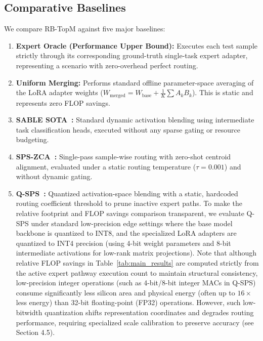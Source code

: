 \subsection{Comparative Baselines}
We compare RB-TopM against five major baselines:
\begin{enumerate}
    \item \textbf{Expert Oracle (Performance Upper Bound):} Executes each test sample strictly through its corresponding ground-truth single-task expert adapter, representing a scenario with zero-overhead perfect routing.
    \item \textbf{Uniform Merging:} Performs standard offline parameter-space averaging of the LoRA adapter weights ($W_{\text{merged}} = W_{\text{base}} + \frac{1}{K}\sum A_k B_k$). This is static and represents zero FLOP savings.
    \item \textbf{SABLE SOTA~\citep{sable2025}:} Standard dynamic activation blending using intermediate task classification heads, executed without any sparse gating or resource budgeting.
    \item \textbf{SPS-ZCA~\citep{spszca2025}:} Single-pass sample-wise routing with zero-shot centroid alignment, evaluated under a static routing temperature ($\tau = 0.001$) and without dynamic gating.
    \item \textbf{Q-SPS~\citep{qsps2026}:} Quantized activation-space blending with a static, hardcoded routing coefficient threshold to prune inactive expert paths. To make the relative footprint and FLOP savings comparison transparent, we evaluate Q-SPS under standard low-precision edge settings where the base model backbone is quantized to INT8, and the specialized LoRA adapters are quantized to INT4 precision (using 4-bit weight parameters and 8-bit intermediate activations for low-rank matrix projections). Note that although relative FLOP savings in Table~\ref{tab:main_results} are computed strictly from the active expert pathway execution count to maintain structural consistency, low-precision integer operations (such as 4-bit/8-bit integer MACs in Q-SPS) consume significantly less silicon area and physical energy (often up to $16\times$ less energy) than 32-bit floating-point (FP32) operations. However, such low-bitwidth quantization shifts representation coordinates and degrades routing performance, requiring specialized scale calibration to preserve accuracy (see Section 4.5).
\end{enumerate}

